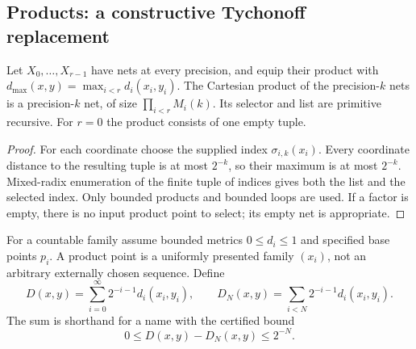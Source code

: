 \subsection{Products: a constructive Tychonoff replacement}

\begin{theorem}\label{thm:finite-metric-product}
Let $X_0,\ldots,X_{r-1}$ have nets at every precision, and equip their
product with $d_{\max}(x,y)=\max_{i<r}d_i(x_i,y_i)$.  The Cartesian
product of the precision-$k$ nets is a precision-$k$ net, of size
$\prod_{i<r}M_i(k)$.  Its selector and list are primitive recursive.
For $r=0$ the product consists of one empty tuple.
\end{theorem}
\begin{proof}
For each coordinate choose the supplied index $\sigma_{i,k}(x_i)$.
Every coordinate distance to the resulting tuple is at most $2^{-k}$,
so their maximum is at most $2^{-k}$.  Mixed-radix enumeration of the
finite tuple of indices gives both the list and the selected index.
Only bounded products and bounded loops are used.  If a factor is empty,
there is no input product point to select; its empty net is appropriate.
\end{proof}

For a countable family assume bounded metrics $0\leq d_i\leq 1$ and
specified base points $p_i$.  A product point is a uniformly presented
family $(x_i)$, not an arbitrary externally chosen sequence.  Define
\begin{equation}\label{eq:product-metric}
 D(x,y)=\sum_{i=0}^{\infty}2^{-i-1}d_i(x_i,y_i),\qquad
 D_N(x,y)=\sum_{i<N}2^{-i-1}d_i(x_i,y_i).
\end{equation}
The sum is shorthand for a name with the certified bound
\begin{equation}\label{eq:product-tail}
0\leq D(x,y)-D_N(x,y)\leq 2^{-N}.
\end{equation}

